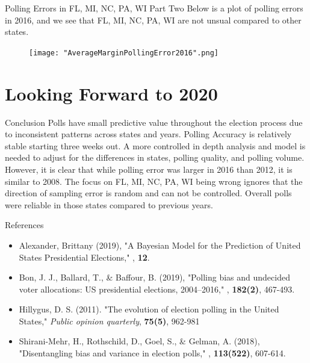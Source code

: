 \documentclass{beamer}\usepackage[]{graphicx}\usepackage[]{color}
\begin{document}
\begin{frame}{Polling Errors in FL, MI, NC, PA, WI Part Two}
Below is a plot of polling errors in 2016, and we see that FL, MI, NC, PA, WI are not unsual compared to other states. 
\begin{figure}[h]
       \centering
        \texttt{[image: "AverageMarginPollingError2016".png]}
    \end{figure}
\end{frame}


\section{Looking Forward to 2020}
\begin{frame}{Conclusion}
Polls have small predictive value throughout the election process due to inconsistent patterns across states and years. Polling Accuracy is relatively stable starting three weeks out.  A more controlled in depth analysis and model is needed to adjust for the differences in states, polling quality, and polling volume. However, it is clear that while polling error was larger in 2016 than 2012, it is similar to 2008.  The focus on FL, MI, NC, PA, WI being wrong ignores that the direction of sampling error is random and can not be controlled. Overall polls were reliable in those states compared to previous years.
\end{frame}

\begin{frame}{References}
\begin{itemize}
\item Alexander, Brittany (2019), "A Bayesian Model for the Prediction of United States Presidential Elections," , \textbf{12}. 
\item Bon, J. J., Ballard, T., \& Baffour, B. (2019), "Polling bias and undecided voter allocations: US presidential elections, 2004–2016," , \textbf{182(2)}, 467-493.
\item Hillygus, D. S. (2011). "The evolution of election polling in the United States," \textit{Public opinion quarterly}, \textbf{75(5)}, 962-981
\item Shirani-Mehr, H., Rothschild, D., Goel, S., \& Gelman, A. (2018), "Disentangling bias and variance in election polls," , \textbf{113(522)}, 607-614.
\end{itemize}
\end{frame}
\end{document}
